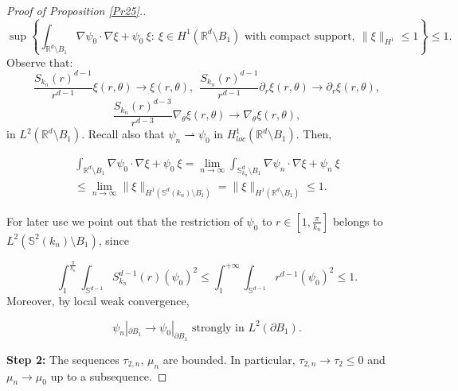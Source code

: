 \documentclass[reqno]{amsart}
\def\R{\mathbb R}
\numberwithin{equation}{section}
\newenvironment{key words}{\textbf{Keywords}\mbox{  }}{ }
\begin{document}
\begin{proof}[Proof of Proposition \ref{Pr25}.]
$$ \sup \left \{\int_{\R^d \setminus B_1} \nabla \psi_0 \cdot \nabla \xi + \psi_0 \ \xi:\ \xi \in  H^1(\R^d \setminus B_1) \mbox{ with compact support}, \ \|\xi \|_{H^1} \leq 1 \right  \} \leq 1.$$
Observe that:
$$\frac{S_{k_n}(r)^{d-1}}{r^{d-1}} \xi(r, \theta) \to \xi(r, \theta), \ \ \frac{S_{k_n}(r)^{d-1}}{r^{d-1}} \partial_r \xi (r, \theta) \to \partial_r \xi(r, \theta), $$$$ \frac{S_{k_n}(r)^{d-3}}{r^{d-3}} \nabla_{\theta} \xi(r, \theta) \to \nabla_{\theta} \xi(r, \theta),$$
in $L^2(\R^d \setminus B_1)$. Recall also that $\psi_n \rightharpoonup \psi_0 $ in $H^1_{loc}(\R^d \setminus B_1)$. Then,

\begin{align*} \int_{\R^d \setminus B_1} \nabla \psi_0 \cdot \nabla \xi + \psi_0 \  \xi = \lim_{n \to \infty} \int_{\mathbb{S}_{k_n}^d \setminus B_1}  \nabla \psi_n \cdot \nabla \xi + \psi_n \  \xi \\ \leq \lim_{n \to \infty} \| \xi\|_{H^1(\mathbb{S}^d(k_n) \setminus B_1)}  = \| \xi\|_{H^1(\mathbb{\R}^d \setminus B_1)} \leq 1. \end{align*}

For later use we point out that the restriction of $\psi_0$ to $r \in [1,\frac{\pi}{k_n} ]$ belongs to $L^2(\mathbb{S}^2(k_n) \setminus B_1)$,
since

$$ \int_{1}^{\frac{\pi}{k_n}} \int_{\mathbb{S}^{d-1}} S^{d-1}_{k_n}(r) (\psi_0)^2 \leq
\int_{1}^{+\infty} \int_{\mathbb{S}^{d-1}} r^{d-1} (\psi_0)^2 \leq 1.$$
Moreover, by local weak convergence,

\begin{equation} \label{compact bd} \psi_n|_{\partial B_1} \to \psi_0|_{\partial B_1} \mbox{ strongly in } L^2(\partial B_1). \end{equation}

\medskip

\textbf{Step 2:} The sequences $\tau_{2,n}$, $\mu_n$ are bounded. In particular, $\tau_{2,n}\rightarrow {\tau}_{2} \leq 0$ and $\mu_n \to \mu_0$ up to a subsequence.

\medskip


\end{proof}
\end{document}
